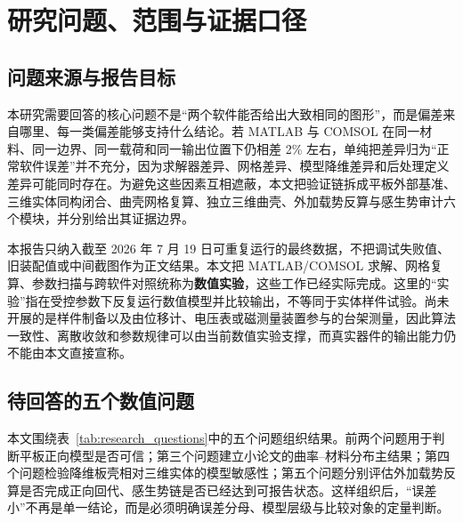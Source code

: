 \documentclass[UTF8,fontset=windows,11pt,a4paper]{ctexart}
\begin{document}
\newpage
\begingroup
\scriptsize
\setlength{\parskip}{0pt}
\tableofcontents
\endgroup
\newpage

\section{研究问题、范围与证据口径}

\subsection{问题来源与报告目标}

本研究需要回答的核心问题不是“两个软件能否给出大致相同的图形”，而是偏差来自哪里、每一类偏差能够支持什么结论。若 MATLAB 与 COMSOL 在同一材料、同一边界、同一载荷和同一输出位置下仍相差 2\% 左右，单纯把差异归为“正常软件误差”并不充分，因为求解器差异、网格差异、模型降维差异和后处理定义差异可能同时存在。为避免这些因素互相遮蔽，本文把验证链拆成平板外部基准、三维实体同构闭合、曲壳网格复算、独立三维曲壳、外加载势反算与感生势审计六个模块，并分别给出其证据边界。

本报告只纳入截至 2026 年 7 月 19 日可重复运行的最终数据，不把调试失败值、旧装配值或中间截图作为正文结果。本文把 MATLAB/COMSOL 求解、网格复算、参数扫描与跨软件对照统称为\textbf{数值实验}，这些工作已经实际完成。这里的“实验”指在受控参数下反复运行数值模型并比较输出，不等同于实体样件试验。尚未开展的是样件制备以及由位移计、电压表或磁测量装置参与的台架测量，因此算法一致性、离散收敛和参数规律可以由当前数值实验支撑，而真实器件的输出能力仍不能由本文直接宣称。

\subsection{待回答的五个数值问题}

本文围绕表~\ref{tab:research_questions}中的五个问题组织结果。前两个问题用于判断平板正向模型是否可信；第三个问题建立小论文的曲率--材料分布主结果；第四个问题检验降维板壳相对三维实体的模型敏感性；第五个问题分别评估外加载势反算是否完成正向回代、感生势链是否已经达到可报告状态。这样组织后，“误差小”不再是单一结论，而是必须明确误差分母、模型层级与比较对象的定量判断。
\end{document}
